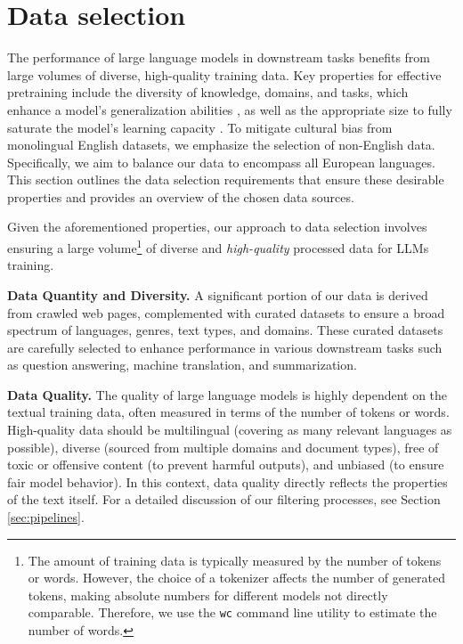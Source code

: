 \section{Data selection}
\label{sec:datasets}


The performance of large language models in downstream tasks benefits from large volumes of diverse, high-quality training data. Key properties for effective pretraining include the diversity of knowledge, domains, and tasks, which enhance a model's generalization abilities \cite{gao_biderman_etal2020}, as well as the appropriate size to fully saturate the model's learning capacity \cite{jordan_hoffmann_etal2022}. To mitigate cultural bias from monolingual English datasets, we emphasize the selection of non-English data. Specifically, we aim to balance our data to encompass all European languages. 
This section outlines the data selection requirements that ensure these desirable properties 
and provides an overview of the chosen data sources.

Given the aforementioned properties, 
our approach to data selection involves ensuring a large volume\footnote{The amount of training data is typically measured by the number of tokens or words. However, the choice of a tokenizer affects the number of generated tokens, making absolute numbers for different models not directly comparable. Therefore, we use the \texttt{wc} command line utility to estimate the number of words.} of diverse and \textsl{high-quality} processed data for LLMs training. 

\textbf{Data Quantity and Diversity.}
A significant portion of our data is derived from crawled web pages, complemented with curated datasets to ensure a broad spectrum of languages, genres, text types, and domains. These curated datasets are carefully selected to enhance performance in various downstream tasks such as question answering, machine translation, and summarization.


\textbf{Data Quality.} 
The quality of large language models is highly dependent on the textual training data, often measured in terms of the number of tokens or words. High-quality data should be multilingual (covering as many relevant languages as possible), diverse (sourced from multiple domains and document types), free of toxic or offensive content (to prevent harmful outputs), and unbiased (to ensure fair model behavior). In this context, data quality directly reflects the properties of the text itself. For a detailed discussion of our filtering processes, see Section  \ref{sec:pipelines}.

